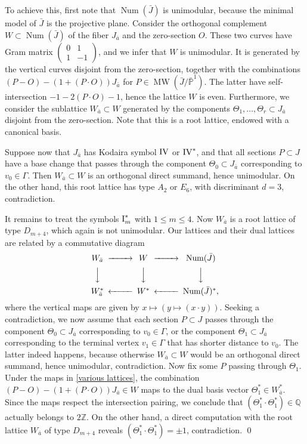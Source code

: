 \documentclass[oneside, 12pt]{amsart}
\theoremstyle{definition}
\theoremstyle{remark}
\newcommand{\ZZ}{\mathbb{Z}}
\newcommand{\QQ}{\mathbb{Q}}
\newcommand{\PP}{\mathbb{P}}
\newcommand{\I}{\text{\rm I}}
\newcommand{\IV}{\text{\rm IV}}
\newcommand{\MW}{\operatorname{MW}}
\newcommand{\Num}{\operatorname{Num}}
\newcommand{\bJ}{{\bar{J}}}
\newcommand{\ba}{{\bar{a}}}
\begin{document}
To achieve this, first note that $\Num(\bJ)$
is unimodular, because  the  minimal model of $\bJ$ is the projective plane.
Consider the orthogonal complement $W\subset\Num(\bJ)$ of the fiber $J_\ba$ and the zero-section $O$.
These two curves have Gram matrix $(\begin{smallmatrix}0&1\\1&-1\end{smallmatrix})$, and we infer that
$W$ is unimodular. It is generated by the vertical curves disjoint from the zero-section,
together with the combinations $(P-O)-(1+(P\cdot O))J_\ba$ for $P\in \MW(\bJ/\bar{\PP}^1)$.
The latter have self-intersection $-1-2(P\cdot O)-1$, hence  the lattice $W$ is even.
Furthermore, we consider the sublattice $W_\ba\subset W$  generated by the components $\Theta_1,\ldots,\Theta_r\subset J_\ba$ disjoint
from the zero-section. Note that this  is a root lattice, endowed with a canonical basis.

Suppose now that $J_\ba$ has Kodaira symbol $\IV$ or $\IV^*$, and that 
all sections $P\subset J$ have a base change that
passes through the component $\Theta_0\subset J_\ba$ corresponding to $v_0\in\Gamma$.
Then $W_\ba\subset W$ is an orthogonal direct summand, hence unimodular. On the other hand, this root lattice has type $A_2$ or $E_6$,
with discriminant $d=3$, contradiction.

It remains to treat the symbols $\I_m^*$ with $1\leq m\leq 4$.
Now $W_\ba$ is a root lattice of type $D_{m+4}$, which again is  not unimodular.
Our lattices and their dual lattices are related by a commutative diagram
\begin{equation}
\label{various lattices}
\begin{CD}
W_\ba	@>>>	W	@>>>	\Num(\bJ)\\
@VVV		@VVV		@VVV\\
W_\ba^*	@<<<	W^*	@<<<	\Num(\bJ)^*,
\end{CD}
\end{equation}
where the vertical maps are given by $x\mapsto (y\mapsto (x\cdot y))$. 
Seeking a contradiction, we now assume that each section $P\subset J$ passes through
the component  $\Theta_0\subset J_\ba$ corresponding to $v_0\in\Gamma$, or the
component $\Theta_1\subset J_\ba$ corresponding to the terminal vertex  $v_1\in\Gamma$  that has shorter distance to $v_0$.
The latter indeed happens, because otherwise $W_\ba\subset W$ would be an orthogonal direct summand, hence unimodular,
contradiction. Now fix some $P$ passing through $\Theta_1$.  Under the maps in \eqref{various lattices}, the combination $(P-O)-(1+(P\cdot O))J_\ba\in W$
maps to the dual basis vector  $\Theta_1^*\in W_\ba^*$. Since the maps  respect the 
intersection pairing, we conclude that $(\Theta_1^*\cdot\Theta_1^*)\in \QQ$ actually belongs to $2\ZZ$.
On the other hand, a direct computation with the root lattice $W_\ba$ of type $D_{m+4}$ reveals $(\Theta_1^*\cdot\Theta_1^*)=\pm 1$,
contradiction.
\qed
\end{document}
